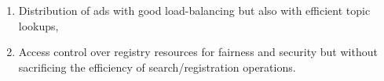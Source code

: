 \begin{enumerate}
        \item Distribution of ads with good load-balancing but also with efficient topic lookups,
        \item Access control over registry resources for fairness and security but without sacrificing the efficiency of search/registration operations.
\end{enumerate}




